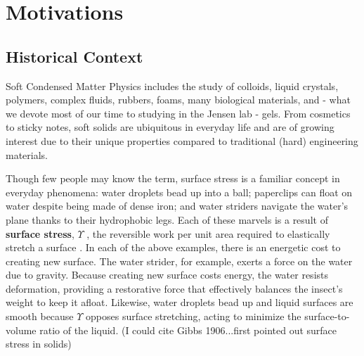 

\section{Motivations}
\subsection{Historical Context}

Soft Condensed Matter Physics includes the study of colloids, liquid crystals, polymers, complex fluids, rubbers, foams, many biological materials, and - what we devote most of our time to studying in the Jensen lab - gels. From cosmetics to sticky notes, soft solids are ubiquitous in everyday life and are of growing interest due to their unique properties compared to traditional (hard) engineering materials. 

Though few people may know the term, surface stress is a familiar concept in everyday phenomena: water droplets bead up into a ball; paperclips can float on water despite being made of dense iron; and water striders navigate the water's plane thanks to their hydrophobic legs. Each of these marvels is a result of \textbf{surface stress}, $\Upsilon$ , the reversible work per unit area required to elastically stretch a surface \cite{cammarata1994surface}. In each of the above examples, there is an energetic cost to creating new surface. The water strider, for example, exerts a force on the water due to gravity. Because creating new surface costs energy, the water resists deformation, providing a restorative force that effectively balances the insect’s weight to keep it afloat.  Likewise, water droplets bead up and liquid surfaces are smooth because $\Upsilon$ opposes surface stretching, acting to minimize the surface-to-volume ratio of the liquid. (I could cite Gibbs 1906...first pointed out surface stress in solids)

